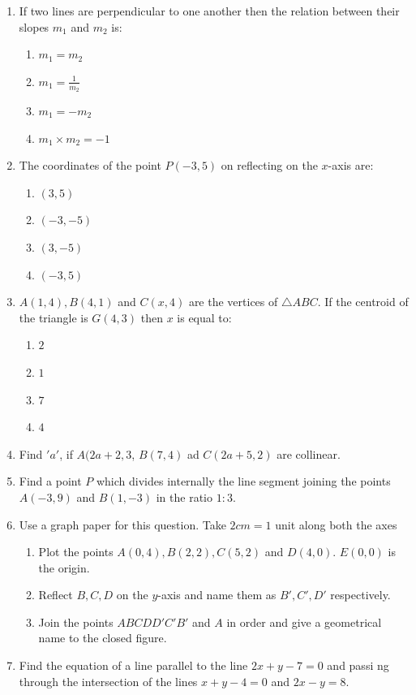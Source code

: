 \documentclass{article}
\begin{document}
\begin{enumerate}
	\item If two lines are perpendicular to one another then the relation between their slopes $m_{1}$ and $m_{2}$ is:
		\begin{enumerate}
			\item $m_{1} = m_{2}$
			\item $m_{1} = \frac{1}{m_{2}}$
			\item $m_{1} = -m_{2}$
			\item $m_{1} \times m_{2} = -1$
		\end{enumerate}
	\item The coordinates of the point $P(-3,5)$ on reflecting on the $x$-axis are:
		\begin{enumerate}
			\item $(3, 5)$
			\item $(-3, -5)$
			\item $(3, -5)$
			\item $(-3, 5)$
		\end{enumerate}
	\item $A(1, 4), B(4, 1)$ and $C(x, 4)$ are the vertices of $\bigtriangleup ABC$. If the centroid of the triangle is $G(4, 3)$ then $x$ is equal to:
		\begin{enumerate}
			\item $2$
			\item $1$
			\item $7$
			\item $4$
		\end{enumerate}
	\item Find $'a'$, if $A(2a + 2, 3$, $B(7,4)$ ad $C(2a +5, 2)$ are collinear.
	\item Find a point $P$ which divides internally the line segment joining the points $A(-3, 9)$ and $B(1, -3)$ in the ratio $1:3$.
	\item Use a graph paper for this question. Take $2 cm = 1$ unit along both the axes\\
		\begin{enumerate}
			\item Plot the points $A(0, 4), B(2, 2), C(5,2)$ and $D(4,0)$. $E(0, 0)$ is the origin.
			\item Reflect $B, C, D$ on the $y$-axis and name them as $B', C', D'$ respectively.
			\item Join the points $ABCDD'C'B'$ and $A$ in order and give a geometrical name to the closed figure.
		\end{enumerate}
	\item Find the equation of a line parallel to the line $2x + y - 7 = 0$ and passi    ng through the intersection of the lines $x + y- 4 =0$ and $2x - y =8$.

\end{enumerate}
\end{document}
